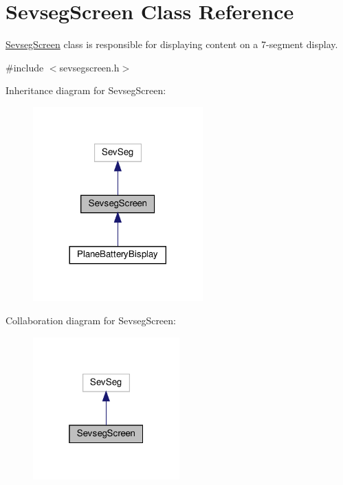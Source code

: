 \hypertarget{class_sevseg_screen}{}\section{Sevseg\+Screen Class Reference}
\label{class_sevseg_screen}


\hyperlink{class_sevseg_screen}{Sevseg\+Screen} class is responsible for displaying content on a 7-\/segment display.  




{\ttfamily \#include $<$sevsegscreen.\+h$>$}



Inheritance diagram for Sevseg\+Screen\+:\nopagebreak
\begin{figure}[H]
\begin{center}
\leavevmode
\includegraphics[width=185pt]{class_sevseg_screen__inherit__graph}
\end{center}
\end{figure}


Collaboration diagram for Sevseg\+Screen\+:\nopagebreak
\begin{figure}[H]
\begin{center}
\leavevmode
\includegraphics[width=160pt]{class_sevseg_screen__coll__graph}
\end{center}
\end{figure}
